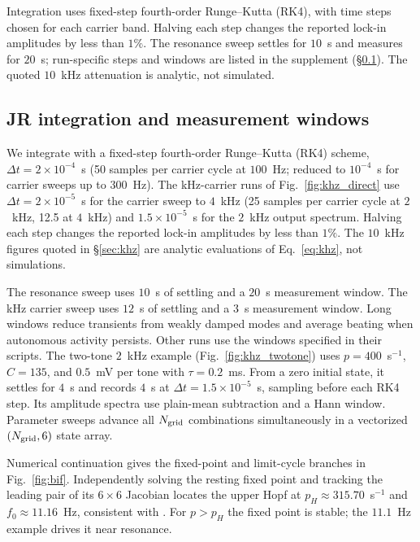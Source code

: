 \documentclass[11pt,a4paper]{article}
\newif\ifjne
\begin{document}
Integration uses fixed-step fourth-order Runge--Kutta (RK4), with time steps
chosen for each carrier band. Halving each step changes the reported lock-in
amplitudes by less than $1\%$. The resonance sweep settles for $10$~s and measures
for $20$~s; run-specific steps and windows are listed in the supplement
(\S\ref{supp:jr-runs}). The quoted $10$~kHz attenuation is analytic, not simulated.
\ifjne\else
\subsection{JR integration and measurement windows}\label{supp:jr-runs}
We integrate with a fixed-step fourth-order Runge--Kutta (RK4) scheme,
$\Delta t=2\times10^{-4}$~s (50 samples per carrier cycle at $100$~Hz; reduced to
$10^{-4}$~s for carrier sweeps up to $300$~Hz). The kHz-carrier runs of
Fig.~\ref{fig:khz_direct} use $\Delta t=2\times10^{-5}$~s for the carrier sweep to
$4$~kHz (25 samples per carrier cycle at $2$~kHz, 12.5 at $4$~kHz) and
$1.5\times10^{-5}$~s for the $2$~kHz output spectrum. Halving each step changes the
reported lock-in amplitudes by less than $1\%$. The $10$~kHz figures quoted in
\S\ref{sec:khz} are analytic evaluations of Eq.~\eqref{eq:khz}, not simulations.

The resonance sweep uses $10$~s of settling and a $20$~s
measurement window. The kHz carrier sweep uses $12$~s of settling and
a $3$~s measurement window. Long windows reduce transients from weakly damped modes and
average beating when autonomous activity persists. Other runs use the windows
specified in their scripts.
The two-tone $2$~kHz example (Fig.~\ref{fig:khz_twotone}) uses $p=400$~s$^{-1}$,
$C=135$, and $0.5$~mV per tone with $\tau=0.2$~ms. From a zero initial state,
it settles for $4$~s and records $4$~s at $\Delta t=1.5\times10^{-5}$~s,
sampling before each RK4 step. Its amplitude spectra use plain-mean subtraction
and a Hann window. Parameter sweeps advance all $N_{\rm grid}$ combinations simultaneously
in a vectorized $(N_{\rm grid},6)$ state array.

\fi

Numerical continuation gives the fixed-point and limit-cycle branches in
Fig.~\ref{fig:bif}. Independently solving the resting fixed point and tracking
the leading pair of its $6\times6$ Jacobian locates the upper Hopf at
$p_H\approx315.70$~s$^{-1}$ and $f_0\approx11.16$~Hz, consistent with
\cite{grimbert2006}. For $p>p_H$ the fixed point is stable; the $11.1$~Hz
example drives it near resonance.
\end{document}
